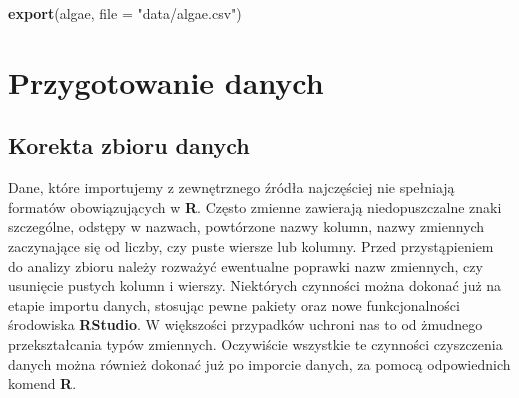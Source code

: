 \documentclass[]{book}
\newenvironment{Shaded}{\begin{snugshade}}{\end{snugshade}}
\newcommand{\CommentTok}[1]{\textcolor[rgb]{0.56,0.35,0.01}{\textit{#1}}}
\newcommand{\DataTypeTok}[1]{\textcolor[rgb]{0.13,0.29,0.53}{#1}}
\newcommand{\DecValTok}[1]{\textcolor[rgb]{0.00,0.00,0.81}{#1}}
\newcommand{\KeywordTok}[1]{\textcolor[rgb]{0.13,0.29,0.53}{\textbf{#1}}}
\newcommand{\NormalTok}[1]{#1}
\newcommand{\StringTok}[1]{\textcolor[rgb]{0.31,0.60,0.02}{#1}}
\theoremstyle{plain}
\theoremstyle{definition}
\begin{document}
\begin{Shaded}
\begin{Highlighting}[]
\KeywordTok{export}\NormalTok{(algae, }\DataTypeTok{file =} \StringTok{"data/algae.csv"}\NormalTok{)}
\end{Highlighting}
\end{Shaded}

\hypertarget{przygotowanie-danych}{%
\chapter{Przygotowanie danych}\label{przygotowanie-danych}}

\hypertarget{korekta-zbioru-danych}{%
\section{Korekta zbioru danych}\label{korekta-zbioru-danych}}

Dane, które importujemy z zewnętrznego źródła najczęściej nie spełniają formatów obowiązujących w \textbf{R}. Często zmienne zawierają niedopuszczalne znaki szczególne, odstępy w nazwach, powtórzone nazwy kolumn, nazwy zmiennych zaczynające się od liczby, czy puste wiersze lub kolumny. Przed przystąpieniem do analizy zbioru należy rozważyć ewentualne poprawki nazw zmiennych, czy usunięcie pustych kolumn i wierszy. Niektórych czynności można dokonać już na etapie importu danych, stosując pewne pakiety oraz nowe funkcjonalności środowiska \textbf{RStudio}. W większości przypadków uchroni nas to od żmudnego przekształcania typów zmiennych. Oczywiście wszystkie te czynności czyszczenia danych można również dokonać już po imporcie danych, za pomocą odpowiednich komend \textbf{R}.

\begin{Shaded}
\end{Shaded}
\end{document}
